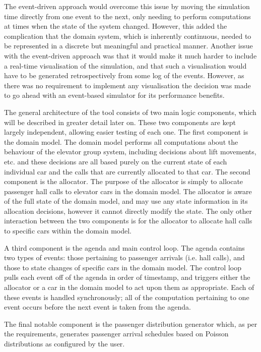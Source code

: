 \documentclass{UoYCSproject}
\begin{document}
The event-driven approach would overcome this issue by moving the simulation time directly from one event to the next, only needing to perform computations at times when the state of the system changed.  However, this added the complication that the domain system, which is inherently continuous, needed to be represented in a discrete but meaningful and practical manner.  Another issue with the event-driven approach was that it would make it much harder to include a real-time visualisation of the simulation, and that such a visualisation would have to be generated retrospectively from some log of the events.  However, as there was no requirement to implement any visualisation the decision was made to go ahead with an event-based simulator for its performance benefits.

The general architecture of the tool consists of two main logic components, which will be described in greater detail later on.  These two components are kept largely independent, allowing easier testing of each one.  The first component is the domain model.  The domain model performs all computations about the behaviour of the elevator group system, including decisions about lift movements, etc. and these decisions are all based purely on the current state of each individual car and the calls that are currently allocated to that car.  The second component is the allocator.  The purpose of the allocator is simply to allocate passenger hall calls to elevator cars in the domain model.  The allocator is aware of the full state of the domain model, and may use any state information in its allocation decisions, however it cannot directly modify the state.  The only other interaction between the two components is for the allocator to allocate hall calls to specific cars within the domain model.

A third component is the agenda and main control loop.  The agenda contains two types of events: those pertaining to passenger arrivals (i.e. hall calls), and those to state changes of specific cars in the domain model.  The control loop pulls each event off of the agenda in order of timestamp, and triggers either the allocator or a car in the domain model to act upon them as appropriate.  Each of these events is handled synchronously; all of the computation pertaining to one event occurs before the next event is taken from the agenda.

The final notable component is the passenger distribution generator which, as per the requirements, generates passenger arrival schedules based on Poisson distributions as configured by the user.
\end{document}
